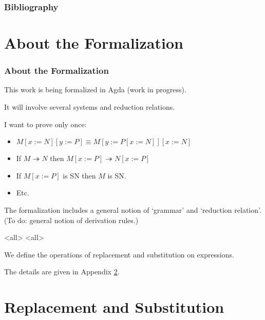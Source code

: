 \todos

\begin{frame}
\frametitle{Bibliography}

\end{frame}

\appendix

\section{About the Formalization}

\begin{frame}
\frametitle{About the Formalization}
This work is being formalized in Agda (work in progress).
\pause

It will involve several systems and reduction relations.

I want to prove only once:
\pause
\begin{itemize}[<+->]
\item
$M[x:=N][y:=P] \equiv M[y:=P[x:=N]][x:=N]$
\item
If $M \twoheadrightarrow N$ then $M[x:=P] \twoheadrightarrow N[x:=P]$
\item
If $M[x:=P]$ is SN then $M$ is SN.
\item
Etc.
\end{itemize}
\pause
The formalization includes a general notion of `grammar' and `reduction relation'.  (To do: general notion of derivation rules.)
\end{frame}


\mode<all>{}
\mode<all>{}

We define the operations of replacement and substitution on
expressions.  




The details are given in Appendix \ref{appendix:repsub}.




%
%
%

\section{Replacement and Substitution}
\label{appendix:repsub}













